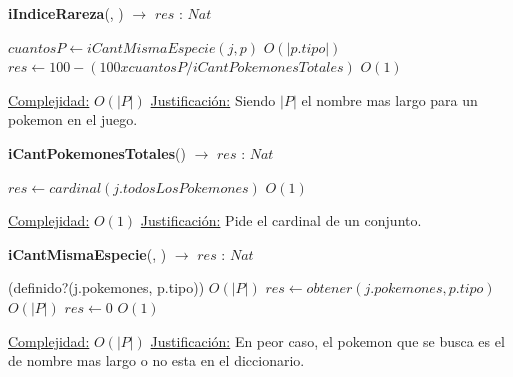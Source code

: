 \begin{algorithm}[H]{\textbf{iIndiceRareza}(, )  $\to$ $res$ : $Nat$} 
	{}
	\begin{algorithmic}
		\State $cuantosP \gets iCantMismaEspecie(j, p) $ \Comment $O(|p.tipo|)$
		\State $res \gets 100 - (100 x cuantosP / iCantPokemonesTotales) $ \Comment $O(1)$
	
		\medskip
		\Statex \underline{Complejidad:} $O(|P|)$
		\Statex \underline{Justificación:} Siendo $|P|$ el nombre mas largo para un pokemon en el juego.
    \end{algorithmic}
\end{algorithm}

\begin{algorithm}[H]{\textbf{iCantPokemonesTotales}() $\to$ $res$ : $Nat$} 
	{}
	\begin{algorithmic}
		\State $res \gets cardinal(j.todosLosPokemones) $ \Comment $O(1)$
	
		\medskip
		\Statex \underline{Complejidad:} $O(1)$
		\Statex \underline{Justificación:} Pide el cardinal de un conjunto.
    \end{algorithmic}
\end{algorithm}

\begin{algorithm}[H]{\textbf{iCantMismaEspecie}(, ) $\to$ $res$ : $Nat$} 
	{}
	\begin{algorithmic}
		\If(definido?(j.pokemones, p.tipo)) \Comment $O(|P|)$
		\State $res \gets obtener(j.pokemones, p.tipo)$ \Comment $O(|P|)$
		\Else
		\State $res \gets 0 $ \Comment $O(1)$
		\EndIf
	
		\medskip
		\Statex \underline{Complejidad:} $O(|P|)$
		\Statex \underline{Justificación:} En peor caso, el pokemon que se busca es el de nombre mas largo o no esta en el diccionario.
    \end{algorithmic}
\end{algorithm}